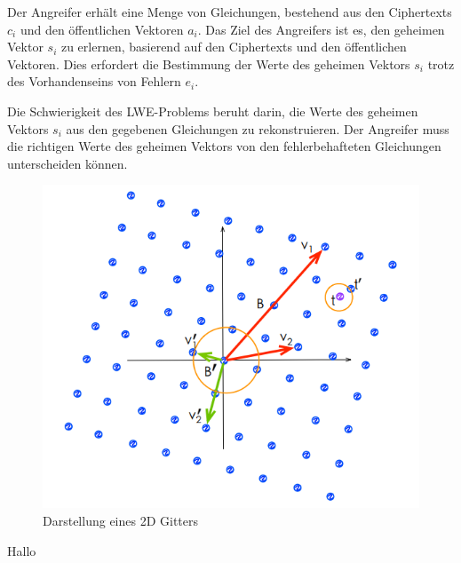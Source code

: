 Der Angreifer erhält eine Menge von Gleichungen, bestehend aus den Ciphertexts $c_i$ und den öffentlichen Vektoren $a_i$. 
Das Ziel des Angreifers ist es, den geheimen Vektor $s_i$ zu erlernen, basierend auf den Ciphertexts und den öffentlichen Vektoren. 
Dies erfordert die Bestimmung der Werte des geheimen Vektors $s_i$ trotz des Vorhandenseins von Fehlern $e_i$.

Die Schwierigkeit des LWE-Problems beruht darin, die Werte des geheimen Vektors $s_i$ aus den gegebenen Gleichungen zu rekonstruieren. 
Der Angreifer muss die richtigen Werte des geheimen Vektors von den fehlerbehafteten Gleichungen unterscheiden können.

\begin{figure}[h]
    \begin{center}
        \includegraphics[width=\columnwidth]{./images/lattice.PNG}
    \end{center}
    \caption{
        Darstellung eines 2D Gitters \\ 
        \cite[Fig. 2]{xuLightingWaySmart2018}
    }
    \label{fig:Darstellung eines 2D Gitters}
\end{figure}

Hallo

